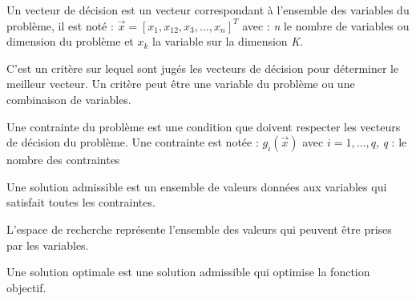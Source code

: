 \begin{definition}
	Un vecteur de décision est un vecteur correspondant à l'ensemble des variables du problème, il est noté : $\vec{x} = [x_1,x_12,x_3,…,x_n]^T$ avec : \emph{n} le nombre de variables ou dimension du problème et $x_k$ la variable sur la dimension \emph{K}.
\end{definition}

\begin{definition}
	C'est un critère sur lequel sont jugés les vecteurs de décision pour déterminer le meilleur vecteur. Un critère peut être une variable du problème ou une combinaison de variables.
\end{definition}

\begin{definition}[Contraintes]
	Une contrainte du problème est une condition que doivent respecter les vecteurs de décision du problème. Une contrainte est notée : $g_i (\vec{x})$ avec $i=1,…, q$, \emph{q} : le nombre des contraintes
\end{definition}

\begin{definition}
	Une solution admissible est un ensemble de valeurs données aux variables qui satisfait toutes les contraintes.
\end{definition}

\begin{definition}
	L'espace de recherche représente l'ensemble des valeurs qui peuvent être prises par les variables.
\end{definition}

\begin{definition}
	Une solution optimale est une solution admissible qui optimise la fonction objectif.
\end{definition}

